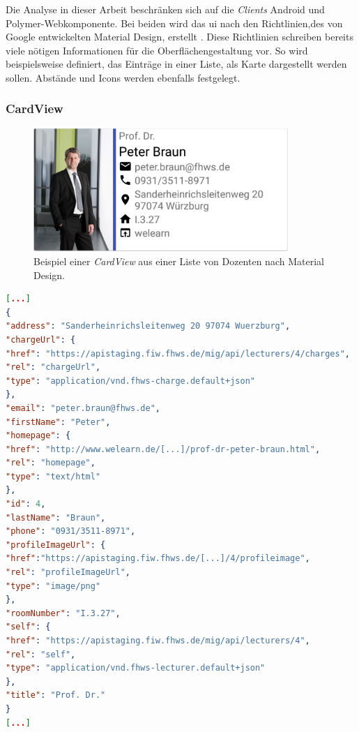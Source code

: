 Die Analyse in dieser Arbeit beschränken sich auf die \textit{Clients} Android und Polymer-Webkomponente. Bei beiden wird das \acf{ui} nach den Richtlinien,des von Google entwickelten Material Design, erstellt \cite{material}. Diese Richtlinien schreiben bereits viele nötigen Informationen für die Oberflächengestaltung vor. So wird beispielsweise definiert, das Einträge in einer Liste, als Karte dargestellt werden sollen. Abstände und Icons werden ebenfalls festgelegt.

\subsubsection{CardView}

\begin{figure}[H]
	\begin{center}
		\includegraphics[width=0.86\textwidth]{images/card.png}
		\caption{Beispiel einer \textit{CardView} aus einer Liste von Dozenten nach Material Design.}
		\label{fig:card}
	\end{center}
\end{figure}

\newpage

\begin{lstlisting}[label=lst:braun_json,
language=json,
firstnumber=1,
caption=Demo Daten eines Dozenten.]	
[...]	   
{
"address": "Sanderheinrichsleitenweg 20 97074 Wuerzburg",
"chargeUrl": {
"href": "https://apistaging.fiw.fhws.de/mig/api/lecturers/4/charges",
"rel": "chargeUrl",
"type": "application/vnd.fhws-charge.default+json"
},
"email": "peter.braun@fhws.de",
"firstName": "Peter",
"homepage": {
"href": "http://www.welearn.de/[...]/prof-dr-peter-braun.html",
"rel": "homepage",
"type": "text/html"
},
"id": 4,
"lastName": "Braun",
"phone": "0931/3511-8971",
"profileImageUrl": {
"href":"https://apistaging.fiw.fhws.de/[...]/4/profileimage",
"rel": "profileImageUrl",
"type": "image/png"
},
"roomNumber": "I.3.27",
"self": {
"href": "https://apistaging.fiw.fhws.de/mig/api/lecturers/4",
"rel": "self",
"type": "application/vnd.fhws-lecturer.default+json"
},
"title": "Prof. Dr."
}
[...]
\end{lstlisting}

